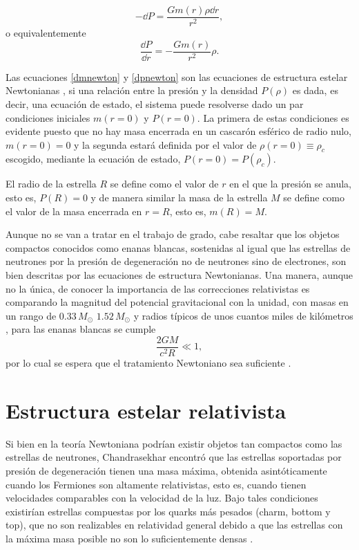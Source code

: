\begin{equation}
    -\dd P =\frac{Gm(r)\rho\dd r}{r^2},
\end{equation}
o equivalentemente
\begin{equation}
    \frac { \dd P } { \dd r } = - \frac { G m ( r ) } { r ^ { 2 } } \rho.
    \label{dpnewton}
\end{equation}

Las ecuaciones \eqref{dmnewton} y \eqref{dpnewton} son las ecuaciones de estructura estelar Newtonianas \cite{Chandrasekhar1958}, si una relación entre la presión y la densidad $P(\rho)$ es dada, es decir, una ecuación de estado, el sistema puede resolverse dado un par condiciones iniciales $m(r=0)$ y $P(r=0)$. La primera de estas condiciones es evidente puesto que no hay masa encerrada en un cascarón esférico de radio nulo, $m(r=0)=0$ y la segunda estará definida por el valor de $\rho(r=0)\equiv\rho_c$ escogido, mediante la ecuación de estado, $P(r=0)=P(\rho_c)$.

El radio de la estrella $R$ se define como el valor de $r$ en el que la presión se anula, esto es, $P(R)=0$ y de manera similar la masa de la estrella $M$ se define como el valor de la masa encerrada en $r=R$, esto es, $m(R)=M$.

Aunque no se van a tratar en el trabajo de grado, cabe resaltar que los objetos compactos conocidos como enanas blancas, sostenidas al igual que las estrellas de neutrones por la presión de degeneración no de neutrones sino de electrones, son bien descritas por las ecuaciones de estructura Newtonianas. Una manera, aunque no la única, de conocer la importancia de las correcciones relativistas es comparando la magnitud del potencial gravitacional con la unidad, con masas en un rango de $0.33\,M_{\odot}$ $1.52\,M_{\odot}$ y radios típicos de unos cuantos miles de kilómetros \cite{Glendenning2000}, para las enanas blancas se cumple
\begin{equation}
    \frac{2GM}{c^2R}\ll 1,
\end{equation}
por lo cual se espera que el tratamiento Newtoniano sea suficiente \cite{Weinberg1972}. 

\section{Estructura estelar relativista}

Si bien en la teoría Newtoniana podrían existir objetos tan compactos como las estrellas de neutrones, Chandrasekhar encontró que las estrellas soportadas por presión de degeneración tienen una masa máxima, obtenida asintóticamente cuando los Fermiones son altamente relativistas, esto es, cuando tienen velocidades comparables con la velocidad de la luz. Bajo tales condiciones existirían estrellas compuestas por los quarks más pesados (charm, bottom y top), que no son realizables en relatividad general debido a que las estrellas con la máxima masa posible no son lo suficientemente densas \cite{Glendenning2000}.

